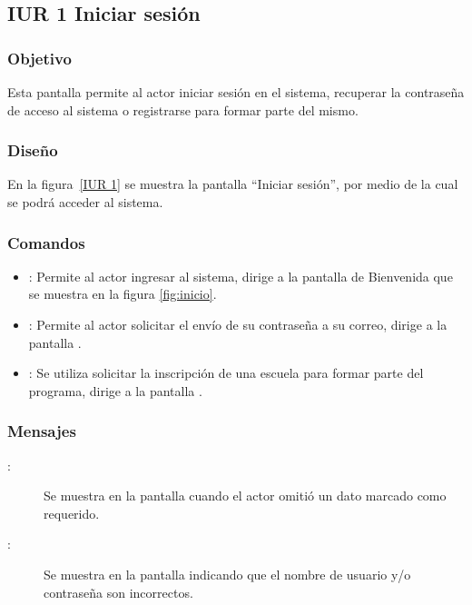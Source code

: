 \subsection{IUR 1 Iniciar sesión}
 
\subsubsection{Objetivo}

    Esta pantalla permite al actor  iniciar sesión en el sistema, recuperar la contraseña de acceso al sistema o registrarse para formar parte del mismo.

\subsubsection{Diseño}

    En la figura~\ref{IUR 1} se muestra la pantalla ``Iniciar sesión'', por medio de la cual se podrá acceder al sistema. \\


\subsubsection{Comandos}
\begin{itemize}
    \item {}: Permite al actor ingresar al sistema, dirige a la pantalla de Bienvenida que se muestra en la figura \ref{fig:inicio}.
    \item {}: Permite al actor solicitar el envío de su contraseña a su correo, dirige a la pantalla .
    \item {}: Se utiliza solicitar la inscripción de una escuela para formar parte del programa, dirige a la pantalla .
\end{itemize}

\subsubsection{Mensajes}

\begin{description}
    \item[:] Se muestra en la pantalla  cuando el actor omitió un dato marcado como requerido.
    \item[:] Se muestra en la pantalla  indicando que el nombre de usuario y/o contraseña son incorrectos.
\end{description}